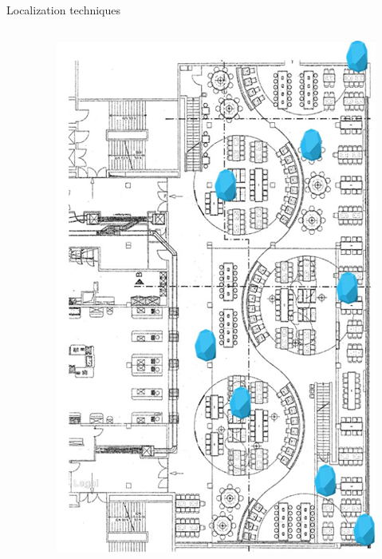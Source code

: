 \documentclass[11pt]{beamer}
\begin{document}
\begin{frame}{Localization techniques}
\begin{columns}
\begin{column}{0.65\textwidth}
    \end{column}

    \hfill
    \begin{column}{0.3\textwidth}
      \includegraphics[width=\textwidth]{beaconfunctionality}%
    \end{column}

  \end{columns}

\end{frame}
\end{document}
